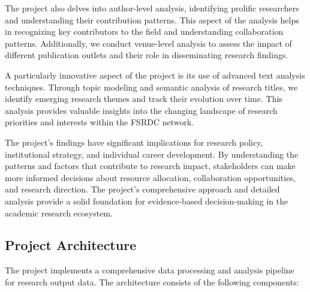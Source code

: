 \documentclass[12pt]{article}
\begin{document}
The project also delves into author-level analysis, identifying prolific researchers and understanding their contribution patterns. This aspect of the analysis helps in recognizing key contributors to the field and understanding collaboration patterns. Additionally, we conduct venue-level analysis to assess the impact of different publication outlets and their role in disseminating research findings.

A particularly innovative aspect of the project is its use of advanced text analysis techniques. Through topic modeling and semantic analysis of research titles, we identify emerging research themes and track their evolution over time. This analysis provides valuable insights into the changing landscape of research priorities and interests within the FSRDC network.

The project's findings have significant implications for research policy, institutional strategy, and individual career development. By understanding the patterns and factors that contribute to research impact, stakeholders can make more informed decisions about resource allocation, collaboration opportunities, and research direction. The project's comprehensive approach and detailed analysis provide a solid foundation for evidence-based decision-making in the academic research ecosystem.

\subsection{Project Architecture}
The project implements a comprehensive data processing and analysis pipeline for research output data. The architecture consists of the following components:
\end{document}
